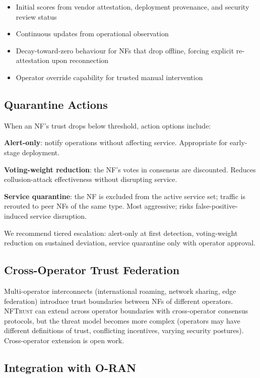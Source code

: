 \documentclass[sigconf,nonacm]{acmart}
\begin{document}
\begin{itemize}
  \item Initial scores from vendor attestation, deployment
        provenance, and security review status
  \item Continuous updates from operational observation
  \item Decay-toward-zero behaviour for NFs that drop offline,
        forcing explicit re-attestation upon reconnection
  \item Operator override capability for trusted manual
        intervention
\end{itemize}

\subsection{Quarantine Actions}

When an NF's trust drops below threshold, action options
include:

\textbf{Alert-only}: notify operations without affecting service.
Appropriate for early-stage deployment.

\textbf{Voting-weight reduction}: the NF's votes in consensus are
discounted. Reduces collusion-attack effectiveness without disrupting
service.

\textbf{Service quarantine}: the NF is excluded from the active
service set; traffic is rerouted to peer NFs of the same type.
Most aggressive; risks false-positive-induced service disruption.

We recommend tiered escalation: alert-only at first detection,
voting-weight reduction on sustained deviation, service quarantine
only with operator approval.

\subsection{Cross-Operator Trust Federation}

Multi-operator interconnects (international roaming, network
sharing, edge federation) introduce trust boundaries between
NFs of different operators. \textsc{NFTrust} can extend across
operator boundaries with cross-operator consensus protocols, but
the threat model becomes more complex (operators may have
different definitions of trust, conflicting incentives, varying
security postures). Cross-operator extension is open work.

\subsection{Integration with O-RAN}
\end{document}
